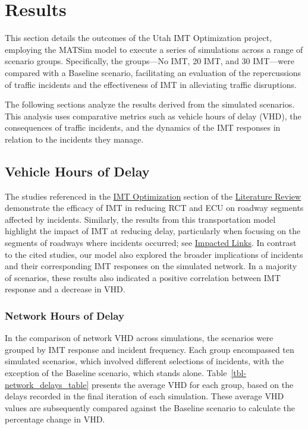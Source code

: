 \documentclass[fancy, oneside, mastersfancy, ms]{byuthesis}
\begin{document}

\hypertarget{sec-results}{%
\chapter{Results}\label{sec-results}}

This section details the outcomes of the Utah IMT Optimization project,
employing the MATSim model to execute a series of simulations across a
range of scenario groups. Specifically, the groups---No IMT, 20 IMT, and
30 IMT---were compared with a Baseline scenario, facilitating an
evaluation of the repercussions of traffic incidents and the
effectiveness of IMT in alleviating traffic disruptions.

The following sections analyze the results derived from the simulated
scenarios. This analysis uses comparative metrics such as vehicle hours
of delay (VHD), the consequences of traffic incidents, and the dynamics
of the IMT responses in relation to the incidents they manage.

\hypertarget{vehicle-hours-of-delay}{%
\section{Vehicle Hours of Delay}\label{vehicle-hours-of-delay}}

The studies referenced in the \protect\hyperlink{sec-lit_imt_opt}{IMT
Optimization} section of the
\protect\hyperlink{sec-literature}{Literature Review} demonstrate the
efficacy of IMT in reducing RCT and ECU on roadway segments affected by
incidents. Similarly, the results from this transportation model
highlight the impact of IMT at reducing delay, particularly when
focusing on the segments of roadways where incidents occurred; see
\protect\hyperlink{sec-impacted}{Impacted Links}. In contrast to the
cited studies, our model also explored the broader implications of
incidents and their corresponding IMT responses on the simulated
network. In a majority of scenarios, these results also indicated a
positive correlation between IMT response and a decrease in VHD.

\hypertarget{network-hours-of-delay}{%
\subsection{Network Hours of Delay}\label{network-hours-of-delay}}

In the comparison of network VHD across simulations, the scenarios were
grouped by IMT response and incident frequency. Each group encompassed
ten simulated scenarios, which involved different selections of
incidents, with the exception of the Baseline scenario, which stands
alone. Table~\ref{tbl-network_delays_table} presents the average VHD for
each group, based on the delays recorded in the final iteration of each
simulation. These average VHD values are subsequently compared against
the Baseline scenario to calculate the percentage change in VHD.
\end{document}
